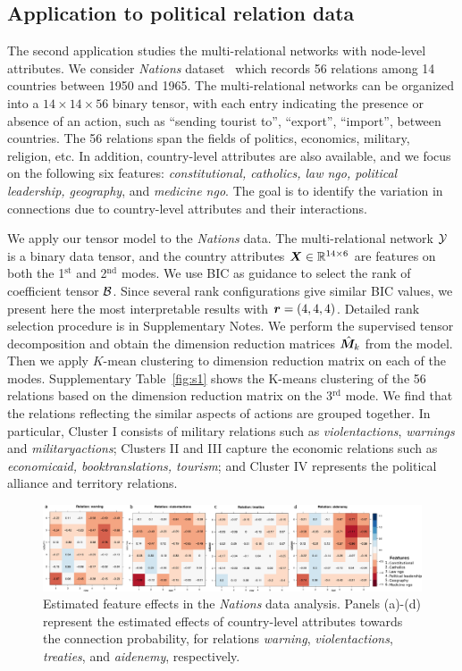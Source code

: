 \documentclass[12pt]{article}
\theoremstyle{definition}
\theoremstyle{definition}
\begin{document}
\subsection{Application to political relation data}

The second application studies the multi-relational networks with node-level attributes. We consider \emph{Nations} dataset~\citep{nickel2011three} which records 56 relations among 14 countries between 1950 and 1965. The multi-relational networks can be organized into a $14 \times 14 \times 56$ binary tensor, with each entry indicating the presence or absence of an action, such as ``sending tourist to'', ``export'', ``import'', between countries. The 56 relations span the fields of politics, economics, military, religion, etc. In addition, country-level attributes are also available, and we focus on the following six features: \emph{constitutional, catholics, law ngo, political leadership, geography}, and \emph{medicine ngo}. The goal is to identify the variation in connections due to country-level attributes and their interactions. 

We apply our tensor model to the \emph{Nations} data. The multi-relational network $\mathcal{Y}$ is a binary data tensor, and the country attributes $\bm X\in\mathbb{R}^{14\times 6}$ are features on both the 1$^\text{st}$ and 2$^\text{nd}$ modes. {\color{blue} We use BIC as guidance to select the rank of coefficient tensor $\mathcal{B}$. Since several rank configurations give similar BIC values, we present here the most interpretable results with $\bm{r}=(4,4,4)$. Detailed rank selection procedure is in Supplementary Notes.}
We perform the supervised tensor decomposition and obtain the dimension reduction matrices $\hat {\bm M}_k$ from the model. Then we apply $K$-mean clustering to dimension reduction matrix on each of the modes. Supplementary Table~\ref{fig:s1} shows the K-means clustering of the 56 relations based on the dimension reduction matrix on the 3$^\text{rd}$ mode. We find that the relations reflecting the similar aspects of actions are grouped together. In particular, Cluster I consists of military relations such as \emph{violentactions}, \emph{warnings} and \emph{militaryactions}; Clusters II and III capture the economic relations such as \emph{economicaid, booktranslations, tourism}; and Cluster IV represents the political alliance and territory relations. 

\begin{figure}[!h]
\centering
\includegraphics[width=16cm]{coef.pdf}
\caption{Estimated feature effects in the \emph{Nations} data analysis. Panels (a)-(d) represent the estimated effects of country-level attributes towards the connection probability, for relations \emph{warning}, \emph{violentactions}, \emph{treaties}, and \emph{aidenemy}, respectively. }\label{fig:est}
\end{figure}
\end{document}
